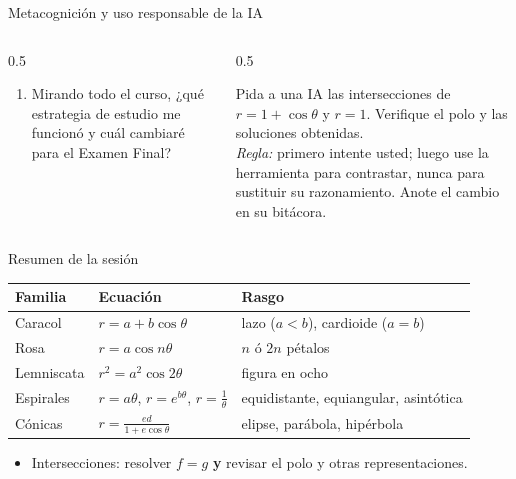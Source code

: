 \documentclass[10pt,aspectratio=169]{beamer}
\begin{document}
\begin{frame}{Metacognición y uso responsable de la IA}
  \small
  \begin{columns}[t]
    \begin{column}{0.5\textwidth}
      \begin{metacog}
        \begin{enumerate}
          \metacomun
          \item Mirando todo el curso, ¿qué estrategia de estudio me funcionó y cuál cambiaré para el Examen Final?
        \end{enumerate}
      \end{metacog}
    \end{column}
    \begin{column}{0.5\textwidth}
      \begin{iabox}
        Pida a una IA las intersecciones de $r=1+\cos\theta$ y $r=1$. Verifique el polo y las soluciones obtenidas.\\[2pt]
        \textit{Regla:} primero intente usted; luego use la herramienta para contrastar, nunca para sustituir su razonamiento. Anote el cambio en su bitácora.
      \end{iabox}
    \end{column}
  \end{columns}
\end{frame}

\begin{frame}{Resumen de la sesión}
  \renewcommand{\arraystretch}{1.4}
  \begin{center}
    \begin{tabular}{l|l|l}
      \textbf{Familia} & \textbf{Ecuación} & \textbf{Rasgo}\\ \hline
      Caracol & $r=a+b\cos\theta$ & lazo ($a<b$), cardioide ($a=b$)\\
      Rosa & $r=a\cos n\theta$ & $n$ ó $2n$ pétalos\\
      Lemniscata & $r^2=a^2\cos2\theta$ & figura en ocho\\
      Espirales & $r=a\theta$, $r=e^{b\theta}$, $r=\frac1\theta$ & equidistante, equiangular, asintótica\\
      Cónicas & $r=\frac{ed}{1+e\cos\theta}$ & elipse, parábola, hipérbola
    \end{tabular}
  \end{center}
  \begin{itemize}
    \item Intersecciones: resolver $f=g$ \textbf{y} revisar el polo y otras representaciones.
  \end{itemize}
\end{frame}
\end{document}
